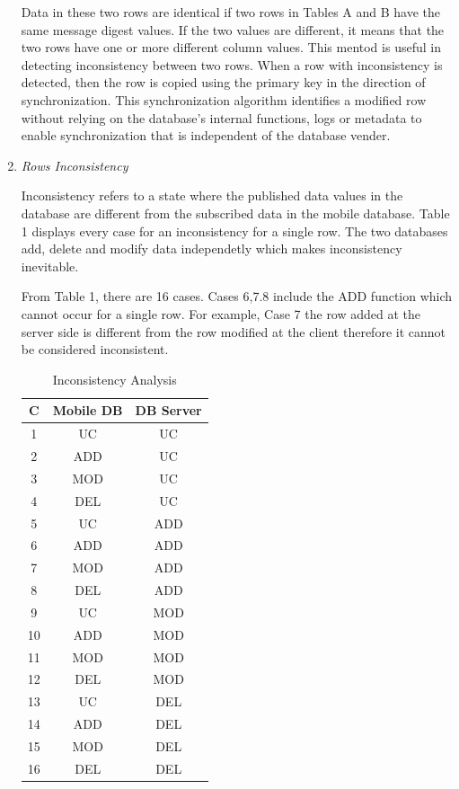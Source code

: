 \documentclass[conference]{IEEEtran}
\begin{document}
\begin{enumerate}[label=(\Alph*)]
Data in these two rows are identical if two rows in Tables A and B have the same message digest values. If the two values are different, it means that the two rows have one or more different column values. This mentod is useful in detecting inconsistency between two rows. When a row with inconsistency is detected, then the row is copied using the primary key in the direction of synchronization. This synchronization algorithm identifies a modified row without relying on the database's internal functions, logs or metadata to enable synchronization that is independent of the database vender. 

\item \textit{Rows Inconsistency}

Inconsistency refers to a state where the published data values in the database are different from the subscribed data in the mobile database. Table 1 displays every case for an inconsistency for a single row. The two databases add, delete and modify data independetly which makes inconsistency inevitable.

From Table 1, there are 16 cases. Cases 6,7.8 include the ADD function which cannot occur for a single row. For example, Case 7 the row added at the server side is different from the row modified at the client therefore it cannot be considered inconsistent.

\begin{table}[ht]
\centering
\setlength\tabcolsep{16pt}
\caption{Inconsistency Analysis}
\begin{tabular}{||c c c ||} 
	\hline
 C & Mobile DB & DB Server \\ [0.5ex] 
 \hline\hline
 1 & UC & UC \\ 
 	\hline
 2 & ADD & UC  \\
 	\hline
 3 & MOD & UC \\
 	\hline
 4 & DEL & UC  \\
 	\hline
 5 & UC & ADD \\
 	\hline
 6 & ADD & ADD  \\
 	\hline
 7 & MOD & ADD  \\
 	\hline
 8 & DEL & ADD  \\
 	\hline
 9 & UC & MOD  \\
 	\hline
 10 & ADD & MOD  \\
 	\hline
 11 & MOD & MOD  \\
 	\hline
 12 & DEL & MOD  \\
 	\hline
 13 & UC & DEL  \\
 	\hline
 14 & ADD & DEL  \\
 	\hline
 15 & MOD & DEL  \\
 	\hline
 16 & DEL & DEL  \\  
    \hline

\end{tabular}
\label{table:1}
\end{table}

\end{enumerate}
\end{document}
